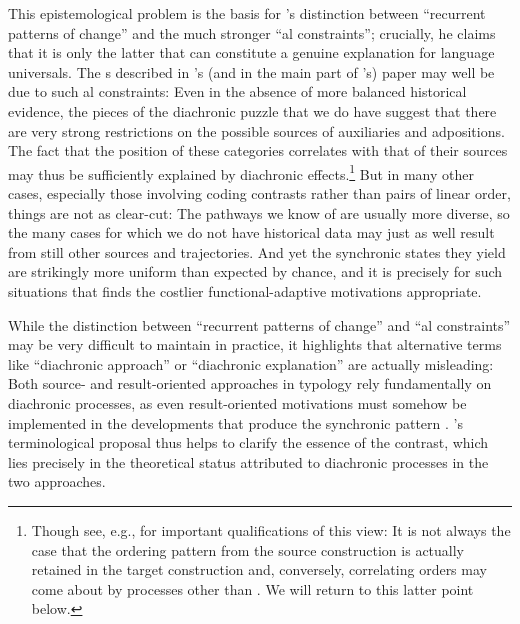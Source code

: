 \documentclass[output=paper]{langsci/langscibook}
\begin{document}
This epistemological problem is the basis for ’s distinction between “recurrent patterns of change” and the much stronger “al constraints”; crucially, he claims that it is only the latter that can constitute a genuine explanation for language universals. The s described in ’s (and in the main part of ’s) paper may well be due to such al constraints: Even in the absence of more balanced historical evidence, the pieces of the diachronic puzzle that we do have suggest that there are very strong restrictions on the possible sources of auxiliaries and adpositions. The fact that the position of these categories correlates with that of their sources may thus be sufficiently explained by diachronic  effects.\footnote{Though see, e.g., \citet[210--215]{Harris1995_Hist} for important qualifications of this view: It is not always the case that the ordering pattern from the source construction is actually retained in the target construction and, conversely, correlating orders may come about by processes other than . We will return to this latter point below.} But in many other cases, especially those involving coding contrasts rather than pairs of linear order, things are not as clear-cut: The pathways we know of are usually more diverse, so the many cases for which we do not have historical data may just as well result from still other sources and trajectories. And yet the synchronic states they yield are strikingly more uniform than expected by chance, and it is precisely for such situations that  finds the costlier functional-adaptive motivations appropriate.

While the distinction between “recurrent patterns of change” and “al constraints” may be very difficult to maintain in practice, it highlights that alternative terms like “diachronic approach” or “diachronic explanation” are actually misleading: Both source- and result-oriented approaches in typology rely fundamentally on diachronic processes, as even result-oriented motivations must somehow be implemented in the developments that produce the synchronic pattern \citep{Haspelmath1999_Opt}. ’s terminological proposal thus helps to clarify the essence of the contrast, which lies precisely in the theoretical status attributed to diachronic processes in the two approaches. 
\end{document}
